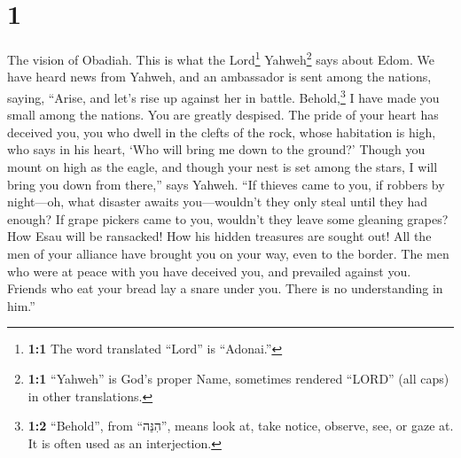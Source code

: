\hypertarget{section}{%
\section{1}\label{section}}

 The vision of Obadiah. This is what the Lord\footnote{\textbf{1:1}
  The word translated ``Lord'' is ``Adonai.''} Yahweh\footnote{\textbf{1:1}
  ``Yahweh'' is God's proper Name, sometimes rendered ``LORD'' (all
  caps) in other translations.} says about Edom. We have heard news from
Yahweh, and an ambassador is sent among the nations, saying, ``Arise,
and let's rise up against her in battle. 
Behold,\footnote{\textbf{1:2} ``Behold'', from ``הִנֵּה'', means look
  at, take notice, observe, see, or gaze at. It is often used as an
  interjection.} I have made you small among the nations. You are
greatly despised.  The pride of your heart has deceived
you, you who dwell in the clefts of the rock, whose habitation is high,
who says in his heart, `Who will bring me down to the ground?'
 Though you mount on high as the eagle, and though your
nest is set among the stars, I will bring you down from there,'' says
Yahweh.  ``If thieves came to you, if robbers by
night---oh, what disaster awaits you---wouldn't they only steal until
they had enough? If grape pickers came to you, wouldn't they leave some
gleaning grapes?  How Esau will be ransacked! How his
hidden treasures are sought out!  All the men of your
alliance have brought you on your way, even to the border. The men who
were at peace with you have deceived you, and prevailed against you.
Friends who eat your bread lay a snare under you. There is no
understanding in him.''

